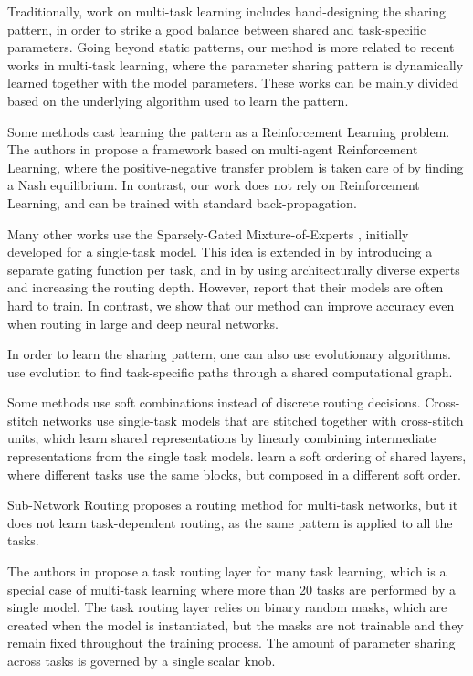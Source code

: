 \documentclass[conference]{IEEEtran}
\begin{document}
Traditionally, work on multi-task learning includes hand-designing the sharing pattern, in order to strike a good balance between shared and task-specific parameters. 
Going beyond static patterns, our method is more related to recent works in multi-task learning, where the parameter sharing pattern is dynamically learned together with the model parameters. These works can be mainly divided based on the underlying algorithm  used to learn the pattern.

Some methods cast learning the pattern as a Reinforcement Learning problem. The authors in \cite{RoutingNetworks18, RoutingNetsChallenges} propose a framework based on multi-agent Reinforcement Learning, where the positive-negative transfer problem is taken care of by finding a Nash equilibrium. In contrast, our work does not rely on Reinforcement Learning, and can be trained with standard back-propagation.

Many other works use the Sparsely-Gated Mixture-of-Experts \cite{Shazeer-MoE-2017}, initially developed for a single-task model. This idea is extended in \cite{MMoE-KDD-2018} by introducing a separate gating function per task, and in \cite{Diversity&Depth-ICLR-2019} by using architecturally diverse experts and increasing the routing depth. However, \cite{Diversity&Depth-ICLR-2019} report that their models are often hard to train. In contrast, we show that our method can improve accuracy even when routing in large and deep neural networks.

In order to learn the sharing pattern, one can also use evolutionary algorithms. \cite{Fernando2017-Pathnet} use evolution to find task-specific paths through a shared computational graph.

Some methods use soft combinations instead of discrete routing decisions. Cross-stitch networks \cite{CrossStichNetworks} use single-task models that are stitched together with cross-stitch units, which learn shared representations by linearly combining intermediate representations from the single task models. \cite{MeyerMiikk-ICLR-2018} learn a soft ordering of shared layers, where different tasks use the same blocks, but composed in a different soft order.

Sub-Network Routing \cite{SNR-AAAI19} proposes a routing method for multi-task networks, but it does not learn task-dependent routing, as the same pattern is applied to all the tasks.

The authors in \cite{ManyTaskLearning} propose a task routing layer for many task learning, which is a special case of multi-task learning where more than 20 tasks are performed by a single model. The task routing layer relies on binary random masks, which are created when the model is instantiated, but the masks are not trainable and they remain fixed throughout the training process. The amount of parameter sharing across tasks is governed by a single scalar knob.
\end{document}
